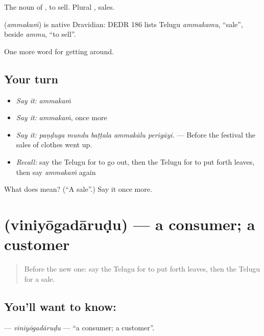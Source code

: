 The noun of , to sell. Plural , sales.

\begin{cousinweb}
\textbf{} (\emph{ammakaṁ}) is native Dravidian: DEDR 186 lists Telugu \emph{ammakamu}, \textquotedblleft{}sale\textquotedblright{}, beside \emph{ammu}, \textquotedblleft{}to sell\textquotedblright{}.
\end{cousinweb}

\begin{grammarlens}[title={What you've built}]
One more word for getting around.
\end{grammarlens}

\subsection*{Your turn}
\begin{itemize}
\raggedright
  \item \emph{Say it:} \emph{ammakaṁ}
  \item \emph{Say it:} \emph{ammakaṁ}, once more
  \item \emph{Say it:} \emph{paṇḍuga mundu baṭṭala ammakālu perigāyi.} — Before the festival the sales of clothes went up.
  \item \emph{Recall:} say the Telugu for to go out, then the Telugu for to put forth leaves, then say \emph{ammakaṁ} again
\end{itemize}

\begin{tcolorbox}[breakable,colback=teal!4,colframe=teal!35!black,title={Before you move on}]
What does  mean? (\textquotedblleft{}A sale\textquotedblright{}.) Say it once more.
\end{tcolorbox}
\section[\texorpdfstring{\te{వినియోగదారుడు} (viniyōgadāruḍu)}{వినియోగదారుడు (viniyōgadāruḍu)}]{ (viniyōgadāruḍu) — a consumer; a customer}

\label{lesson:TE-C484-viniyogadarudu}



\begin{quote}
Before the new one: say the Telugu for to put forth leaves, then the Telugu for a sale.
\end{quote}

\subsection*{You'll want to know: }
\textbf{} — \emph{viniyōgadāruḍu} — \textquotedblleft{}a consumer; a customer\textquotedblright{}.

